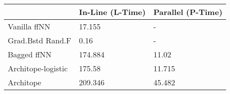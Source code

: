 \begin{tabular}{lll}
\toprule
{} & In-Line (L-Time) & Parallel (P-Time) \\
\midrule
Vanilla ffNN       &           17.155 &                 - \\
Grad.Bstd Rand.F   &             0.16 &                 - \\
Bagged ffNN        &          174.884 &             11.02 \\
Architope-logistic &           175.58 &            11.715 \\
Architope          &          209.346 &            45.482 \\
\bottomrule
\end{tabular}
